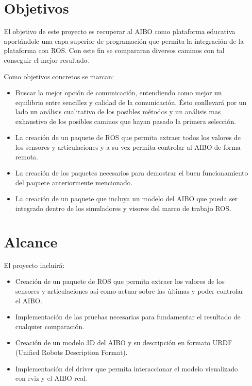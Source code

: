 \documentclass[12pt,a4paper,final,twoside]{book}
\begin{document}
\section{Objetivos}
El objetivo de este proyecto es recuperar al AIBO como plataforma educativa aportándole una capa superior de programación que permita la integración de la plataforma con ROS.
Con este fin  se compararan diversos caminos con tal conseguir el mejor resultado.

Como objetivos concretos se marcan:
\begin{itemize}
\item Buscar la mejor opción de comunicación, entendiendo como mejor un equilibrio entre sencillez y calidad de la comunicación. Ésto conllevará por un lado  un análisis cualitativo de los posibles métodos y un análisis mas exhaustivo de los posibles caminos que hayan pasado la primera selección.

\item La creación de un paquete de ROS que permita extraer todos los valores de los sensores y articulaciones y a su vez permita controlar al AIBO de forma remota.

\item La creación de los paquetes necesarios para demostrar el buen funcionamiento del paquete anteriormente mencionado.

\item La creación de un paquete que incluya un modelo del AIBO que pueda ser integrado dentro de los simuladores y visores del marco de trabajo ROS. 
\end{itemize}

\section{Alcance}
El proyecto incluirá:
\begin{itemize}
\item Creación de un paquete de ROS que permita extraer los valores de los sensores y articulaciones así como actuar sobre las últimas y poder controlar el AIBO.
\item Implementación de las pruebas necesarias para fundamentar el resultado de cualquier comparación.
\item Creación de un modelo 3D del AIBO y su descripción en formato URDF (Unified Robots Description Format).
\item Implementación del driver que permita interaccionar el modelo visualizado con rviz y el AIBO real.
\end{itemize} 
\end{document}

